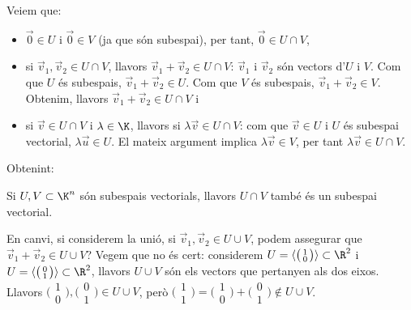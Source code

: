 Veiem que:
\begin{itemize}
    \item $\vec 0\in U$ i $\vec 0\in V$ (ja que són subespai), per tant, $\vec 0\in U \cap V$,
    \item si $\vec v_1, \vec v_2 \in U\cap V$, llavors $\vec v_1+\vec v_2 \in U\cap V$: $\vec v_1$ i $\vec v_2$ són vectors d'$U$ i $V$. Com que $U$ és subespais, $\vec v_1+\vec v_2 \in U$. Com que $V$ és subespais, $\vec v_1+\vec v_2 \in V$. Obtenim, llavors $\vec v_1+\vec v_2 \in U\cap V$ i
    \item si $\vec v \in U\cap V$ i $\lambda \in \K$, llavors si $\lambda \vec v \in U\cap V$: com que $\vec v \in U$ i $U$ és subespai vectorial, $\lambda \vec u\in U$. El mateix argument implica $\lambda \vec v \in V$, per tant $\lambda \vec v \in U\cap V$.
\end{itemize}
Obtenint:
\begin{proposicio}
    Si $U,V\subset \K^n$ són subespais vectorials, llavors $U\cap V$ també és un subespai vectorial.
\end{proposicio}

En canvi, si considerem la unió, si $\vec v_1, \vec v_2 \in U\cup V$, podem assegurar que $\vec v_1+\vec v_2 \in U \cup V$?
Vegem que no és cert: considerem $U=\langle \big( \begin{smallmatrix} 1 \\ 0 \end{smallmatrix}\big) \rangle \subset \R^2$ i $U=\langle \big( \begin{smallmatrix} 0 \\ 1 \end{smallmatrix}\big) \rangle\subset \R^2$, llavors $U\cup V$ són els vectors que pertanyen als dos eixos. Llavors $\big( \begin{smallmatrix} 1 \\ 0 \end{smallmatrix}\big), \big( \begin{smallmatrix} 0 \\ 1 \end{smallmatrix}\big)\in U\cup V$, però $\big( \begin{smallmatrix} 1 \\ 1 \end{smallmatrix}\big)=\big( \begin{smallmatrix} 1 \\ 0 \end{smallmatrix}\big)+\big( \begin{smallmatrix} 0 \\ 1 \end{smallmatrix}\big) \not\in U\cup V$.

